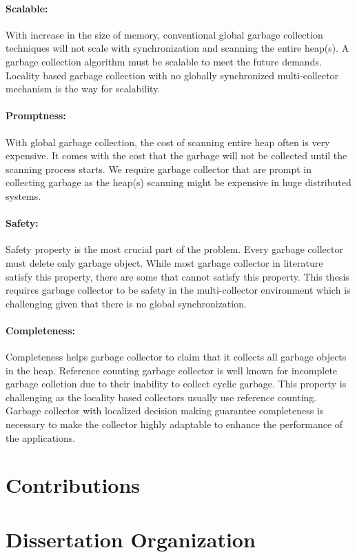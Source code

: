 \paragraph{Scalable:}
	With increase in the size of memory, conventional global garbage collection techniques will not scale with synchronization and scanning the entire heap(s). A garbage collection algorithm must be scalable to meet the future demands. Locality based garbage collection with no globally synchronized multi-collector mechanism is the way for scalability.
\paragraph{Promptness:}
	With global garbage collection, the cost of scanning entire heap often is very expensive. It comes with the cost that the garbage will not be collected until the scanning process starts. We require garbage collector that are prompt in collecting garbage as the heap(s) scanning might be expensive in huge distributed systems.
\paragraph{Safety:}
	Safety property is the most crucial part of the problem. Every garbage collector must delete only garbage object. While most garbage collector in literature satisfy this property, there are some that cannot satisfy this property. This thesis requires garbage collector to be safety in the multi-collector environment which is challenging given that there is no global synchronization.
\paragraph{Completeness:}
	Completeness helps garbage collector to claim that it collects all garbage objects in the heap. Reference counting garbage collector is well known for incomplete garbage colletion due to their inability to collect cyclic garbage. This property is challenging as the locality based collectors usually use reference counting. Garbage collector with localized decision making guarantee completeness is necessary to make the collector highly adaptable to enhance the performance of the applications.
\section{Contributions}
\label{intro:contr}
\section{Dissertation Organization}
\label{intro:do}